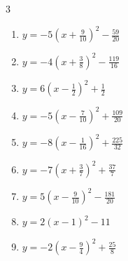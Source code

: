 \begin{multicols}{3}
\begin{enumerate}
        \phantom{$\displaystyle 頂点\left( 1 , 6 \right)$}

  \item $\displaystyle y=-5\left( x+\frac{9}{10}\right)^{2}-\frac{59}{20}$


  \item $\displaystyle y=-4\left( x+\frac{3}{8}\right)^{2}-\frac{119}{16}$


  \item $\displaystyle y=6\left( x-\frac{1}{2}\right)^{2}+\frac{1}{2}$


  \item $\displaystyle y=-5\left( x-\frac{7}{10}\right)^{2}+\frac{109}{20}$


  \item $\displaystyle y=-8\left( x-\frac{1}{16}\right)^{2}+\frac{225}{32}$


  \item $\displaystyle y=-7\left( x+\frac{3}{7}\right)^{2}+\frac{37}{7}$


  \item $\displaystyle y=5\left( x-\frac{9}{10}\right)^{2}-\frac{181}{20}$


  \item $\displaystyle y=2\left( x-1\right)^{2}-11$

        \phantom{$\displaystyle 頂点\left( 1 , -11 \right)$}

\columnbreak %

  \item $\displaystyle y=-2\left( x-\frac{9}{4}\right)^{2}+\frac{25}{8}$



\end{enumerate}
\end{multicols}
